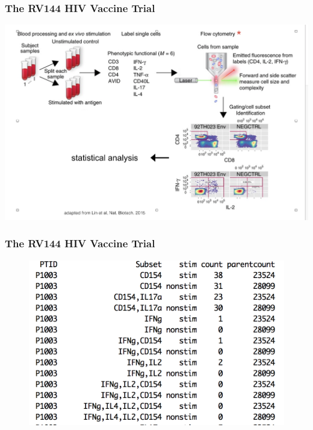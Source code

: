 \documentclass{beamer}
\theoremstyle{definition}
\begin{document}

\begin{frame}
\frametitle{The RV144 HIV Vaccine Trial}
\begin{center}
\includegraphics[scale=0.4]{figures/flowcytintro}
\end{center}
\end{frame}


\begin{frame}
\frametitle{The RV144 HIV Vaccine Trial}
\begin{figure}[]
\includegraphics[width=12 cm]{figures/datasetExample} \caption{}
\end{figure}
\end{frame}

\end{document}
